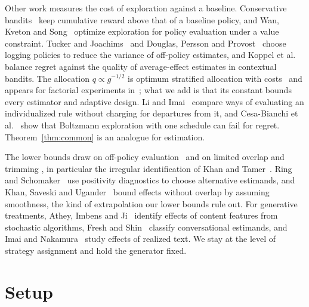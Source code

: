 \documentclass[12pt]{article}
\theoremstyle{definition}
\theoremstyle{remark}
\begin{document}
Other work measures the cost of exploration against a baseline.
Conservative bandits~\cite{wu2016conservative} keep cumulative reward above that of a
baseline policy, and Wan, Kveton and Song~\cite{wan2022safe} optimize exploration for
policy evaluation under a value constraint. Tucker and Joachims~\cite{tucker2023variance}
and Douglas, Persson and Provost~\cite{douglas2026logging} choose logging policies to
reduce the variance of off-policy estimates, and Koppel et al.~\cite{koppel2025explore}
balance regret against the quality of average-effect estimates in contextual bandits.
The allocation $q\propto g^{-1/2}$ is optimum stratified allocation with
costs~\cite{cochran1977sampling} and appears for factorial experiments
in~\cite{ravichandran2024optimal}; what we add is that its constant bounds every
estimator and adaptive design. Li and Imai~\cite{li2024neyman} compare ways of
evaluating an individualized rule without charging for departures from it, and
Cesa-Bianchi et al.~\cite{cesabianchi2017boltzmann} show that Boltzmann exploration
with one schedule can fail for regret. Theorem~\ref{thm:common} is an analogue for
estimation.

The lower bounds draw on off-policy evaluation~\cite{li2015toward,wang2017optimal,mou2023off}
and on limited overlap and trimming
\cite{khan2010irregular,crump2009dealing,rothe2017robust,hong2020inference,ma2020robust},
in particular the irregular identification of Khan and Tamer~\cite{khan2010irregular}.
Ring and Schomaker~\cite{ring2026diagnostic} use positivity diagnostics to choose
alternative estimands, and Khan, Saveski and Ugander~\cite{khan2024off} bound effects
without overlap by assuming smoothness, the kind of extrapolation our lower bounds
rule out. For generative treatments, Athey, Imbens and Ji~\cite{athey2026stochastic}
identify effects of content features from stochastic algorithms, Fresh and
Shin~\cite{fresh2026conversation} classify conversational estimands, and Imai and
Nakamura~\cite{imai2026causal,nakamura2026dynamic} study effects of realized text. We
stay at the level of strategy assignment and hold the generator fixed.

\section{Setup}\label{sec:setup}
\end{document}
